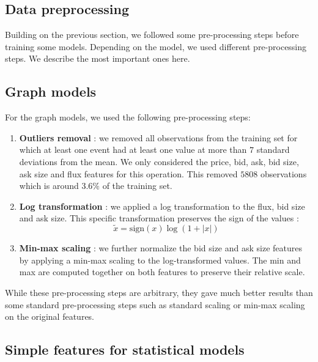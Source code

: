 \documentclass[switch, 11pt]{article}
\begin{document}
\begin{multicols}{2}
    \section{Data preprocessing}

    Building on the previous section, we followed some pre-processing steps before training some models. Depending on the model, we used different pre-processing steps. We describe the most important ones here.

    \subsection{Graph models}

    For the graph models, we used the following pre-processing steps:
    \begin{enumerate}
        \item \textbf{Outliers removal} : we removed all observations from the training set for which at least one event had at least one value at more than $7$ standard deviations from the mean. We only considered the price, bid, ask, bid size, ask size and flux features for this operation. This removed $5808$ observations which is around $3.6\%$ of the training set.
        \item \textbf{Log transformation} : we applied a log transformation to the flux, bid size and ask size. This specific transformation preserves the sign of the values :
              $$\tilde{x}= \text{sign}(x)\log(1+|x|)$$
        \item \textbf{Min-max scaling} : we further normalize the bid size and ask size features by applying a min-max scaling to the log-transformed values. The min and max are computed together on both features to preserve their relative scale.
    \end{enumerate}

    While these pre-processing steps are arbitrary, they gave much better results than some standard pre-processing steps such as standard scaling or min-max scaling on the original features.

    \subsection{Simple features for statistical models}


\end{multicols}
\end{document}
